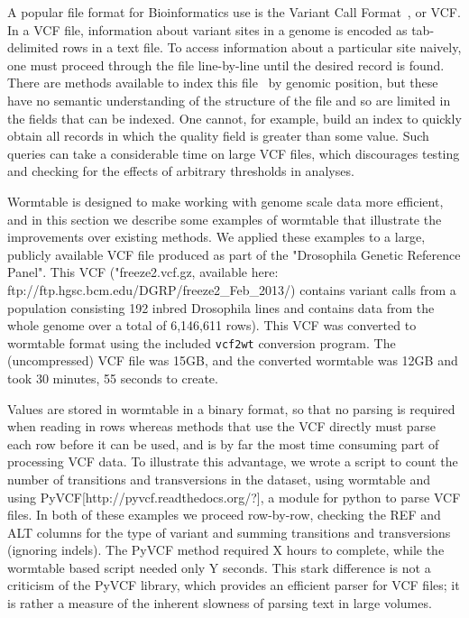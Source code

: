 \documentclass{bioinfo}
\begin{document}
A popular file format for Bioinformatics use is the Variant Call Format~\citep{da+11},
or VCF. In a VCF file, information about variant sites in a genome is encoded 
as tab-delimited rows in a text file. To access information about a 
particular site naively, one must proceed through the file line-by-line until the 
desired record is found. There are methods available to index this 
file~\citep{li11} by genomic position, but these have no semantic 
understanding of the structure of the file and so are limited in the 
fields that can be indexed. One cannot, for example, build an index 
to quickly obtain all records in which the quality field is greater
than some value. Such queries can take a considerable time on large VCF 
files, which discourages testing and checking for the effects of 
arbitrary thresholds in analyses.

Wormtable is designed to make working with genome scale data more 
efficient, and in this section we describe some examples of wormtable
that illustrate the improvements over existing methods. We applied these 
examples to a large, publicly available VCF file produced as part of the
"Drosophila Genetic Reference Panel". This VCF ("freeze2.vcf.gz, available 
here: ftp://ftp.hgsc.bcm.edu/DGRP/freeze2_Feb_2013/) contains variant calls 
from a population consisting 192 inbred Drosophila lines and contains data 
from the whole genome over a total of 6,146,611 rows). This VCF was converted to 
wormtable format using the included \texttt{vcf2wt} conversion program.  
The (uncompressed) VCF file was 15GB, and the converted wormtable was 12GB 
and took 30 minutes, 55 seconds to create.

Values are stored in wormtable in a binary format, so that no parsing is
required when reading in rows whereas methods that use the VCF directly 
must parse each row before it can be used, and is by far the most time 
consuming part of processing VCF data. To illustrate this advantage, we
wrote a script to count the number of transitions and transversions
in the dataset, using wormtable and using PyVCF[http://pyvcf.readthedocs.org/?], a module for
python to parse VCF files. In both of these examples we proceed 
row-by-row, checking the REF and ALT columns for the type of variant and
summing transitions and transversions (ignoring indels). The 
PyVCF method required X hours to complete, while the wormtable 
based script needed only Y seconds. This stark difference is not a 
criticism of the PyVCF library, which provides an efficient parser 
for VCF files; it is rather a measure of the inherent slowness of
parsing text in large volumes.
\end{document}
